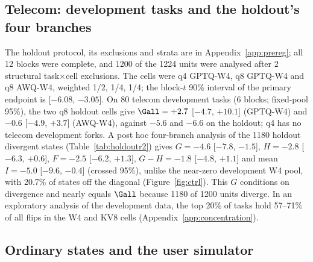 \subsection{Telecom: development tasks and the holdout's four branches}
\label{app:holdoutdev}

The holdout protocol, its exclusions and strata are in Appendix~\ref{app:prereg}; all 12 blocks were complete, and 1200 of the 1224 units were analysed after 2 structural task$\times$cell exclusions. The cells were q4 GPTQ-W4, q8 GPTQ-W4 and q8 AWQ-W4, weighted 1/2, 1/4, 1/4; the block-$t$ 90\% interval of the primary endpoint is [$-6.08$, $-3.05$]. %
On 80 telecom development tasks (6 blocks; fixed-pool 95\%), the two q8 holdout cells give $\Gall=+2.7$ [$-4.7$, $+10.1$] (GPTQ-W4) and $-0.6$ [$-4.9$, $+3.7$]\pp{} (AWQ-W4), against $-5.6$ and $-6.6$ on the holdout; q4 has no telecom development forks. %
A post hoc four-branch analysis of the 1180 holdout divergent states (Table~\ref{tab:holdoutr2}) gives $G=-4.6$ [$-7.8$, $-1.5$], $H=-2.8$ [$-6.3$, $+0.6$], $F=-2.5$ [$-6.2$, $+1.3$], $G-H=-1.8$ [$-4.8$, $+1.1$] and mean $I=-5.0$ [$-9.6$, $-0.4$]\pp{} (crossed 95\%), unlike the near-zero development W4 pool, with 20.7\% of states off the diagonal (Figure~\ref{fig:ctrl}). %
This $G$ conditions on divergence and nearly equals $\Gall$ because 1180 of 1200 units diverge. %
In an exploratory analysis of the development data, the top 20\% of tasks hold 57--71\% of all flips in the W4 and KV8 cells (Appendix~\ref{app:concentration}). %

\subsection{Ordinary states and the user simulator}
\label{app:ordinary}

